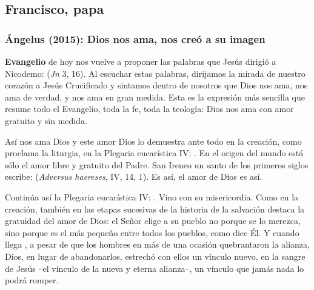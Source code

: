 \newsection
\subsection{Francisco, papa}

\subsubsection{Ángelus (2015): Dios nos ama, nos creó a su imagen}


\begin{body}
 \textbf{Evangelio} de hoy nos vuelve a proponer las palabras que Jesús dirigió a Nicodemo:  (\textit{Jn} 3, 16). Al escuchar estas palabras, dirijamos la mirada de nuestro corazón a Jesús Crucificado y sintamos dentro de nosotros que Dios nos ama, nos ama de verdad, y nos ama en gran medida. Esta es la expresión más sencilla que resume todo el Evangelio, toda la fe, toda la teología: Dios nos ama con amor gratuito y sin medida.

Así nos ama Dios y este amor Dios lo demuestra ante todo en la creación, como proclama la liturgia, en la Plegaria eucarística IV: . En el origen del mundo está sólo el amor libre y gratuito del Padre. San Ireneo un santo de los primeros siglos escribe:  (\textit{Adversus haereses}, IV, 14, 1). Es así, el amor de Dios es así.

Continúa así la Plegaria eucarística IV: . Vino con su misericordia. Como en la creación, también en las etapas sucesivas de la historia de la salvación destaca la gratuidad del amor de Dios: el Señor elige a su pueblo no porque se lo merezca, sino porque es el más pequeño entre todos los pueblos, como dice Él. Y cuando llega , a pesar de que los hombres en más de una ocasión quebrantaron la alianza, Dios, en lugar de abandonarlos, estrechó con ellos un vínculo nuevo, en la sangre de Jesús –el vínculo de la nueva y eterna alianza–, un vínculo que jamás nada lo podrá romper.


\end{body}
